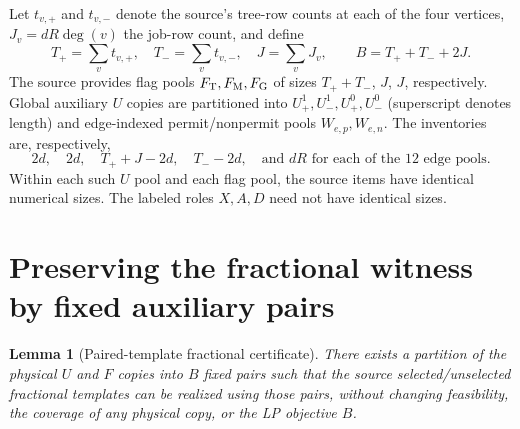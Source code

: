 \documentclass[11pt,a4paper]{article}
\newtheorem{lemma}[theorem]{Lemma}
\begin{document}
Let $t_{v,+}$ and $t_{v,-}$ denote the source's tree-row counts at each of the four vertices, $J_v=dR\deg(v)$ the job-row count, and define
\[
T_+=\sum_v t_{v,+},\quad T_-=\sum_v t_{v,-},\quad J=\sum_v J_v,
\qquad B=T_++T_-+2J.
\]
The source provides flag pools $F_{\rm T},F_{\rm M},F_{\rm G}$ of sizes $T_++T_-$, $J$, $J$, respectively. Global auxiliary $U$ copies are partitioned into $U_+^1,U_-^1,U_+^0,U_-^0$ (superscript denotes length) and edge-indexed permit/nonpermit pools $W_{e,p},W_{e,n}$. The inventories are, respectively,
\[
2d,\quad 2d,\quad T_++J-2d,\quad T_--2d,
\quad\text{and }dR\text{ for each of the 12 edge pools}.
\]
Within each such $U$ pool and each flag pool, the source items have identical numerical sizes. The labeled roles $X,A,D$ need not have identical sizes.

\section{Preserving the fractional witness by fixed auxiliary pairs}
\begin{lemma}[Paired-template fractional certificate]\label{lem:pair}
There exists a partition of the physical $U$ and $F$ copies into $B$ fixed pairs such that the source selected/unselected fractional templates can be realized using those pairs, without changing feasibility, the coverage of any physical copy, or the LP objective $B$.
\end{lemma}
\end{document}
